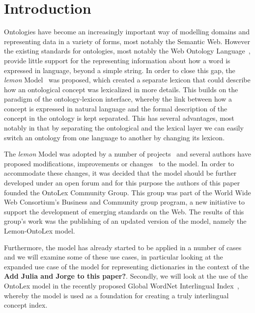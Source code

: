 \documentclass[12pt,a4paper]{elex2017}
\begin{document}
\section{Introduction}

Ontologies have become an increasingly important way of modelling domains and
representing data in a variety of forms, most notably the Semantic Web. However
the existing standards for ontologies, most notably the Web Ontology
Language~\cite[OWL]{mcguinness2004ow}, provide little support for the
representing information about how a word is expressed in language, beyond a
simple string. In order to close this gap, the \emph{lemon}
Model~\cite{mccrae2012interchanging} was proposed, which created a separate
lexicon that could describe how an ontological concept was lexicalized in more
details. This builds on the paradigm of the ontology-lexicon interface, whereby
the link between how a concept is expressed in natural language and the formal
description of the concept in the ontology is kept separated. This has several
advantages, most notably in that by separating the ontological and the lexical
layer we can easily switch an ontology from one language to another by changing
its lexicon. 

The \emph{lemon} Model was adopted by a number of
projects~\citep{navigli2012babelnet,serasset2015dbnary,ecklekohler2015} and
several authors have proposed modifications, improvements or
changes~\citep{khan2014using,chavula2014lemon,bosque2016linked}
to the model. In order to accommodate these changes, it was decided that the
model should be further developed under an open forum and for this purpose the
authors of this paper founded the OntoLex Community Group. This group was part
of the World Wide Web Consortium's Business and Community group program, a new
initiative to support the development of emerging standards on the Web. The
results of this group's work was the publishing of an updated version of the
model, namely the Lemon-OntoLex model.

Furthermore, the model has already started to be applied in a number of cases
and we will examine some of these use cases, in particular looking at the
expanded use case of the model for representing dictionaries in the context of
the \textbf{Add Julia and Jorge to this paper?}. Secondly, we will look at the
use of the OntoLex model in the recently proposed Global WordNet Interlingual
Index~\cite{vossen2016toward,bond2016cili}, whereby the model is used as a
foundation for creating a truly interlingual concept index.
\end{document}
